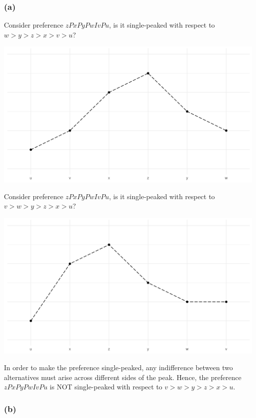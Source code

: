 \documentclass[a4paper]{article}
\begin{document}
\subsubsection*{(a)}

Consider preference $zPxPyPwIvPu$, is it single-peaked with respect to $w>y>z>x>v>u$?

\begin{center}
    \includegraphics[scale=0.5]{images/Ex3.5(a)1.pdf}
\end{center}

Consider preference $zPxPyPwIvPu$, is it single-peaked with respect to $v>w>y>z>x>u$?

\begin{center}
    \includegraphics[scale=0.5]{images/Ex3.5(a)2.pdf}
\end{center}

In order to make the preference single-peaked, any indifference between two alternatives must arise across different sides of the peak. Hence, the preference $zPxPyPwIvPu$ is NOT single-peaked with respect to $v>w>y>z>x>u$.

\subsubsection*{(b)}
\end{document}
